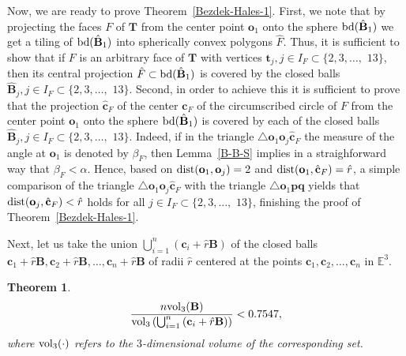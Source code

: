 \documentclass[10pt]{article}
\newtheorem{Theorem}{Theorem}
\numberwithin{Subcase}{Case}
\begin{document}
Now, we are ready to prove Theorem~\ref{Bezdek-Hales-1}. First, we note that by projecting the faces $F$ of $\mathbf{T}$ from the center point $\mathbf{o}_1$ onto the sphere ${\rm bd}(\hat{\mathbf{B}}_1 )$ we get a tiling of ${\rm bd}(\hat{\mathbf{B}}_1 )$ into spherically convex polygons $\hat{F}$. Thus, it is sufficient to show that if $F$ is an arbitrary face of $\mathbf{T}$ with vertices $\mathbf{t}_j, j\in I_F\subset\{2, 3, \dots ,$ $ 13\}$, then its central projection $\hat{F}\subset{\rm bd}(\hat{\mathbf{B}}_1 )$ is covered by the closed balls $\hat{\mathbf{B}}_j, j\in I_F\subset\{2, 3, \dots ,$ $ 13\}$. Second, in order to achieve this it is sufficient to prove that the projection $\hat{\mathbf{c}}_F$ of the center $\mathbf{c}_F$ of the circumscribed circle of $F$ from the center point $\mathbf{o}_1$ onto the sphere ${\rm bd}(\hat{\mathbf{B}}_1 )$ is covered by each of the closed balls $\hat{\mathbf{B}}_j, j\in I_F\subset\{2, 3, \dots ,$ $ 13\}$. Indeed, if in the triangle $\triangle\mathbf{o}_1\mathbf{o}_j\hat{\mathbf{c}}_F$ the measure of the angle at $\mathbf{o}_1$ is denoted by $\beta_F$, then Lemma~\ref{B-B-S} implies in a straighforward way that $\beta_F<\alpha$. Hence, based on ${\rm dist}(\mathbf{o}_1,\mathbf{o}_j)=2$ and ${\rm dist}(\mathbf{o}_1,\hat{\mathbf{c}}_F)=\hat{r}$, a simple comparison of the triangle $\triangle\mathbf{o}_1\mathbf{o}_j\hat{\mathbf{c}}_F$ with the triangle $\triangle\mathbf{o}_1\mathbf{p}\mathbf{q}$ yields that ${\rm dist}(\mathbf{o}_j, \hat{\mathbf{c}}_F)<\hat{r}$ holds for all $j\in I_F\subset\{2, 3, \dots ,$ $ 13\}$, finishing the proof of Theorem~\ref{Bezdek-Hales-1}.  
\endproof

Next, let us take the union $\bigcup_{i=1}^n\left(\mathbf{c}_i+\hat{r}\mathbf{B}\right)$ of the closed balls $\mathbf{c}_1+\hat{r}\mathbf{B}, \mathbf{c}_2+\hat{r}\mathbf{B}, \dots , \mathbf{c}_n+\hat{r}\mathbf{B}$ of radii $\hat{r}$ centered at the points $\mathbf{c}_1, \mathbf{c}_2, \dots , \mathbf{c}_n$ in $\mathbb{E}^3$. 

\begin{Theorem}\label{Bezdek-Hales-2}
$$\frac{n{\rm vol}_3(\mathbf{B})}{{\rm vol}_3\left(\bigcup_{i=1}^n\left(\mathbf{c}_i+\hat{r}\mathbf{B}\right)\right)}<0.7547,$$
where ${\rm vol}_3(\cdot)$ refers to the $3$-dimensional volume of the corresponding set.
\end{Theorem}
\end{document}
